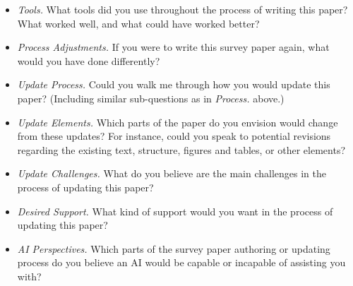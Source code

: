\begin{itemize}
    \item \textit{Tools.} What tools did you use throughout the process of writing this paper? What worked well, and what could have worked better?
    \item \textit{Process Adjustments.} If you were to write this survey paper again, what would you have done differently?
    \item \textit{Update Process.} Could you walk me through how you would update this paper? (Including similar sub-questions as in \textit{Process.} above.)
    \item \textit{Update Elements.} Which parts of the paper do you envision would change from these updates? For instance, could you speak to potential revisions regarding the existing text, structure, figures and tables, or other elements?
    \item \textit{Update Challenges.} What do you believe are the main challenges in the process of updating this paper?
    \item \textit{Desired Support.} What kind of support would you want in the process of updating this paper?
    \item \textit{AI Perspectives.} Which parts of the survey paper authoring or updating process do you believe an AI would be capable or incapable of assisting you with? 
\end{itemize}
